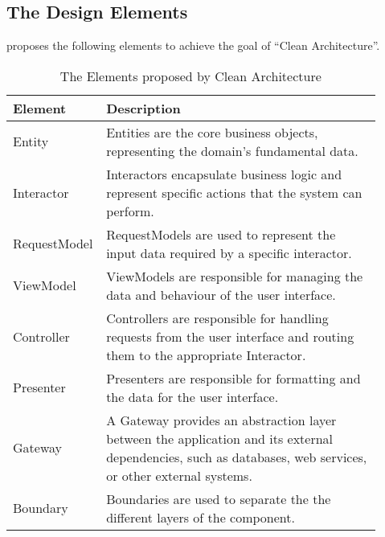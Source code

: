 \subsection{The Design Elements} \label{subsec_design_elements} 

\textcite{robert_c_martin_clean_2018} proposes the following elements to achieve
the goal of \enquote{Clean Architecture}.

\begin{table}[H]
    \begin{tabular}{ p{0.17\linewidth} p{0.74\linewidth}}
        \hline
        \textbf{Element} & \textbf{Description} \\ 
        \hline
        Entity & Entities are the core business objects, representing the domain's
        fundamental data.\\ \midrule

        Interactor & Interactors encapsulate business logic and represent specific actions
        that the system can perform. \\ \midrule

        RequestModel & RequestModels are used to represent the input data required by a specific
        interactor.\\ \midrule

        ViewModel & ViewModels are responsible for managing the data and behaviour of the
        user interface. \\ \midrule

        Controller & Controllers are responsible for handling requests from the user
        interface and routing them to the appropriate Interactor.\\ \midrule

        Presenter & Presenters are responsible for formatting and the data for the user
        interface.\\ \midrule

        Gateway & A Gateway provides an abstraction layer between the application and its
        external dependencies, such as databases, web services, or other external
        systems.\\ \midrule

        Boundary & Boundaries are used to separate the the different layers of the component.\\

        \bottomrule
    \end{tabular}
    \caption{The Elements proposed by Clean Architecture}
    \label{ca_element}
\end{table}